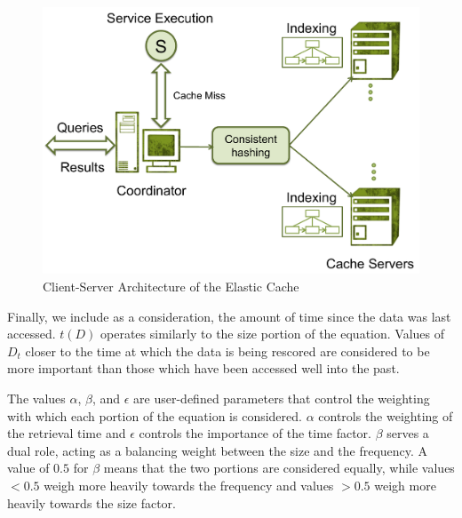 \begin{figure}
\begin{center}
\includegraphics[scale=0.5]{figures/arch.pdf}
\end{center}
\caption{Client-Server Architecture of the Elastic Cache}
\label{fig:architecture2}
\end{figure}

Finally, we include as a consideration, the amount of time since the data was
last accessed. $t(D)$ operates similarly to the size portion of the equation.
Values of $D_t$ closer to the time at which the data is being rescored are
considered to be more important than those which have been accessed well into
the past.

The values $\alpha$, $\beta$, and $\epsilon$ are user-defined parameters that
control the weighting with which each portion of the equation is considered.
$\alpha$ controls the weighting of the retrieval time and $\epsilon$ controls
the importance of the time factor. $\beta$ serves a dual role, acting as a
balancing weight between the size and the frequency. A value of $0.5$ for
$\beta$ means that the two portions are considered equally, while values $<
0.5$ weigh more heavily towards the frequency and values $> 0.5$ weigh more
heavily towards the size factor.



